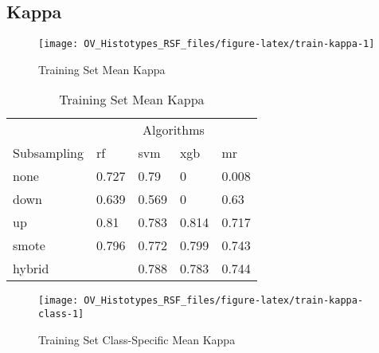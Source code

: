 \documentclass[
]{report}
\begin{document}
\hypertarget{kappa-1}{%
\subsection{Kappa}\label{kappa-1}}

\begin{figure}[H]

{\centering \texttt{[image: OV\_Histotypes\_RSF\_files/figure-latex/train-kappa-1]} 

}

\caption{Training Set Mean Kappa}\label{fig:train-kappa}
\end{figure}

\begin{table}

\caption{\label{tab:train-kappa-table}Training Set Mean Kappa}
\centering
\begin{tabular}[t]{l|l|l|l|l}
\hline
\multicolumn{1}{c|}{ } & \multicolumn{4}{c}{Algorithms} \\
\cline{2-5}
Subsampling & rf & svm & xgb & mr\\
\hline
none & 0.727 & 0.79 & 0 & 0.008\\
\hline
down & 0.639 & 0.569 & 0 & 0.63\\
\hline
up & 0.81 & 0.783 & 0.814 & 0.717\\
\hline
smote & 0.796 & 0.772 & 0.799 & 0.743\\
\hline
hybrid & \cellcolor[HTML]{90ee90}{0.819} & 0.788 & 0.783 & 0.744\\
\hline
\end{tabular}
\end{table}

\begin{figure}[H]

{\centering \texttt{[image: OV\_Histotypes\_RSF\_files/figure-latex/train-kappa-class-1]} 

}

\caption{Training Set Class-Specific Mean Kappa}\label{fig:train-kappa-class}
\end{figure}
\end{document}
